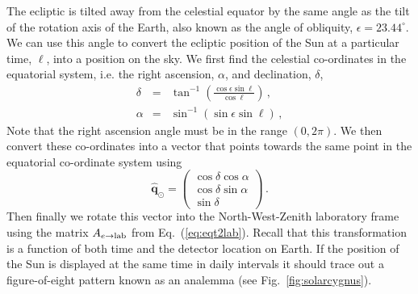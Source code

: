The ecliptic is tilted away from the celestial equator by the same angle as the tilt of the rotation axis of the Earth, also known as the angle of obliquity, $\epsilon = 23.44^\circ$. 
We can use this angle to convert the ecliptic position of the Sun at a particular time, $\ell$, into a position on the sky. We first find the celestial co-ordinates in the equatorial system, i.e. the right ascension, $\alpha$, and declination, $\delta$,
\begin{eqnarray}
 \delta &=& \tan^{-1}{\left(\frac{\cos{\epsilon}\sin{\ell}}{\cos{\ell}}\right)}\, , \\
 \alpha &=& \sin^{-1}{\left(\sin{\epsilon}\sin{\ell}\right)} \, ,
\end{eqnarray}
Note that the right ascension angle must be in the range $(0, 2\pi)$. We then convert these co-ordinates into a vector that points towards the same point in the equatorial co-ordinate system using 
\begin{equation}
 \hat{\textbf{q}}_\odot = \begin{pmatrix}  \cos{\delta} \cos{\alpha} \\ \cos{\delta}\sin{\alpha} \\ \sin{\delta} \end{pmatrix} \, .
\end{equation}
Then finally we rotate this vector into the North-West-Zenith laboratory frame using the matrix $A_{e\rightarrow {\rm lab}}$ from Eq.~(\ref{eq:eqt2lab}). Recall that this transformation is a function of both time and the detector location on Earth. If the position of the Sun is displayed at the same time in daily intervals it should trace out a figure-of-eight pattern known as an analemma (see Fig.~\ref{fig:solarcygnus}).

